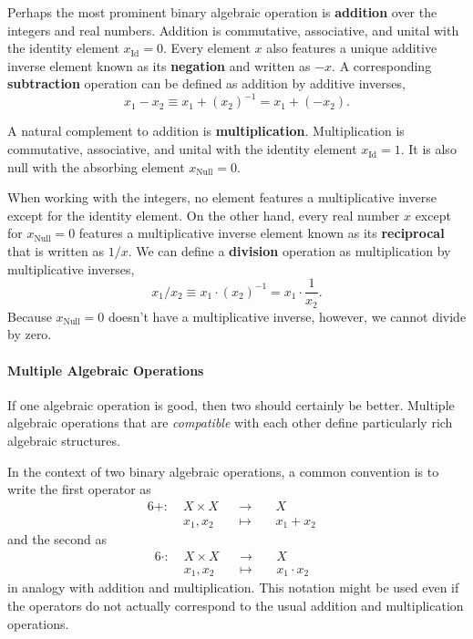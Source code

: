 \documentclass[
  letterpaper,
  DIV=11,
  numbers=noendperiod]{scrartcl}
\let\oldparagraph\paragraph
\renewcommand{\paragraph}[1]{\oldparagraph{#1}\mbox{}}
\begin{document}
Perhaps the most prominent binary algebraic operation is
\textbf{addition} over the integers and real numbers. Addition is
commutative, associative, and unital with the identity element
\(x_{\text{Id}} = 0\). Every element \(x\) also features a unique
additive inverse element known as its \textbf{negation} and written as
\(-x\). A corresponding \textbf{subtraction} operation can be defined as
addition by additive inverses, \[
x_{1} - x_{2} \equiv x_{1} + (x_{2})^{-1} = x_{1} + (-x_{2}).
\]

A natural complement to addition is \textbf{multiplication}.
Multiplication is commutative, associative, and unital with the identity
element \(x_{\text{Id}} = 1\). It is also null with the absorbing
element \(x_{\text{Null}} = 0\).

When working with the integers, no element features a multiplicative
inverse except for the identity element. On the other hand, every real
number \(x\) except for \(x_{\text{Null}} = 0\) features a
multiplicative inverse element known as its \textbf{reciprocal} that is
written as \(1 /x\). We can define a \textbf{division} operation as
multiplication by multiplicative inverses, \[
x_{1} / x_{2} \equiv x_{1} \cdot (x_{2})^{-1}
=
x_{1} \cdot \frac{1}{x_{2}}.
\] Because \(x_{\text{Null}} = 0\) doesn't have a multiplicative
inverse, however, we cannot divide by zero.

\paragraph{Multiple Algebraic
Operations}\label{multiple-algebraic-operations}

If one algebraic operation is good, then two should certainly be better.
Multiple algebraic operations that are \emph{compatible} with each other
define particularly rich algebraic structures.

In the context of two binary algebraic operations, a common convention
is to write the first operator as \begin{alignat*}{6}
+ :\; & X \times X& &\rightarrow& \; & X &
\\
& x_{1}, x_{2} & &\mapsto& & x_{1} + x_{2} &
\end{alignat*} and the second as \begin{alignat*}{6}
\cdot :\; & X \times X& &\rightarrow& \; & X &
\\
& x_{1}, x_{2} & &\mapsto& & x_{1} \cdot x_{2} &
\end{alignat*} in analogy with addition and multiplication. This
notation might be used even if the operators do not actually correspond
to the usual addition and multiplication operations.
\end{document}

